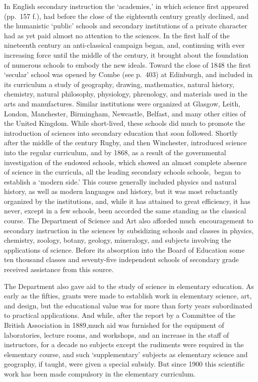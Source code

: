 \documentclass[]{book}
\begin{document}
In English secondary instruction the `academies,' in which science first appeared (pp.~157 f.), had before the close of the eighteenth century greatly declined, and the humanistic `public' schools and secondary institutions of a private character had as yet paid almost no attention to the sciences. In the first half of the nineteenth century an anti-classical campaign began, and, continuing with ever increasing force until the middle of the century, it brought about the foundation of numerous schools to embody the new ideals. Toward the close of 1848 the first `secular' school was opened by Combe (see p.~403) at Edinburgh, and included in its curriculum a study of geography, drawing, mathematics, natural history, chemistry, natural philosophy, physiology, phrenology, and materials used in the arts and manufactures. Similar institutions were organized at Glasgow, Leith, London, Manchester, Birmingham, Newcastle, Belfast, and many other cities of the United Kingdom. While short-lived, these schools did much to promote the introduction of sciences into secondary education that soon followed. Shortly after the middle of the century Rugby, and then Winchester, introduced science into the regular curriculum, and by 1868, as a result of the governmental investigation of the endowed schools, which showed an almost complete absence of science in the curricula, all the leading secondary schools schools,~began to establish a `modern side.' This course generally included physics and natural history, as well as modern languages and history, but it was most reluctantly organized by the institutions, and, while it has attained to great efficiency, it has never, except in a few schools, been accorded the same standing as the classical course. The Department of Science and Art also afforded much~encouragement to secondary instruction in the sciences by subsidizing schools and classes in physics, chemistry, zoology, botany, geology, mineralogy, and subjects involving the applications of science. Before its absorption into the Board of Education some ten thousand classes and seventy-five independent schools of secondary grade received assistance from this source.

The Department also gave aid to the study of science in elementary education. As early as the fifties, grants were made to establish work in elementary science, art, and design, but the educational value was for more than forty years subordinated to practical applications. And while, after the report by a Committee of the British Association in 1889,much aid was furnished for the equipment of laboratories, lecture rooms, and workshops, and an increase in the staff of instructors, for a decade no subjects except the rudiments were required in the elementary course, and such `supplementary' subjects as elementary science and geography, if taught, were given a special subsidy. But since 1900 this scientific work has been made compulsory in the elementary curriculum.
\end{document}
